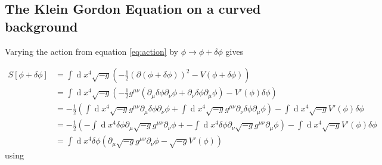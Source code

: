 \documentclass[a4paper]{article}
\DeclareMathOperator*{\diff}{d}
\begin{document}
\subsection{The Klein Gordon Equation on a curved background}
Varying the action from equation \ref{eq:action} by $\phi \rightarrow \phi + \delta \phi$ gives

\begin{align*}
    S[\phi + \delta \phi] &= \int \diff  x^4 \sqrt{-g} \left( - \frac{1}{2} (\partial (\phi + \delta \phi))^2 - V(\phi + \delta \phi)  \right) \\
    &= \int \diff x^4 \sqrt{-g} \left( - \frac{1}{2} g^{\mu \nu} (\partial_\mu \delta \phi \partial_\nu \phi + \partial_\nu \delta \phi \partial_\mu \phi) - V'(\phi) \delta \phi \right) \\
    &= - \frac{1}{2} \left( \int \diff x^4 \sqrt{-g} g^{\mu \nu} \partial_\mu \delta \phi \partial_\nu \phi + \int \diff x^4 \sqrt{-g} g^{\mu \nu} \partial_\nu \delta \phi \partial_\mu \phi \right) - \int \diff  x^4 \sqrt{-g} V'(\phi) \delta \phi \\
    &= - \frac{1}{2} \left( - \int \diff x^4 \delta \phi \partial_\mu \sqrt{-g} g^{\mu \nu} \partial_\nu \phi +
                            - \int \diff x^4 \delta \phi \partial_\nu \sqrt{-g} g^{\mu \nu} \partial_\mu \phi \right) - \int \diff  x^4 \sqrt{-g} V'(\phi) \delta \phi \\
    &= \int \diff  x^4 \delta \phi \left( \partial_\mu \sqrt{-g} g^{\mu \nu} \partial_\nu \phi - \sqrt{-g} V'(\phi) \right)
\end{align*}
using
\end{document}
